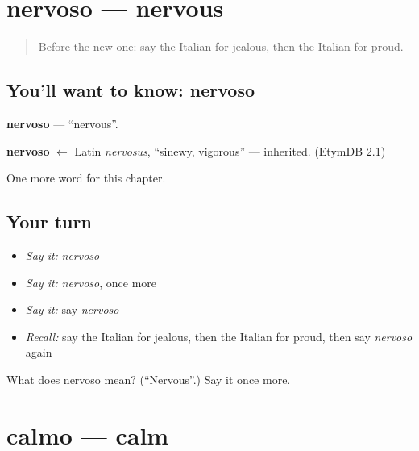 \section[nervoso]{nervoso — nervous}

\label{lesson:IT-C218-nervoso}



\begin{quote}
Before the new one: say the Italian for jealous, then the Italian for proud.
\end{quote}

\subsection*{You'll want to know: nervoso}
\textbf{nervoso} — \textquotedblleft{}nervous\textquotedblright{}.

\begin{cousinweb}
\textbf{nervoso} $\leftarrow$ Latin \emph{nervosus}, \textquotedblleft{}sinewy, vigorous\textquotedblright{} — inherited. (EtymDB 2.1)
\end{cousinweb}

\begin{grammarlens}[title={What you've built}]
One more word for this chapter.
\end{grammarlens}

\subsection*{Your turn}
\begin{itemize}
\raggedright
  \item \emph{Say it:} \emph{nervoso}
  \item \emph{Say it:} \emph{nervoso}, once more
  \item \emph{Say it:} say \emph{nervoso}
  \item \emph{Recall:} say the Italian for jealous, then the Italian for proud, then say \emph{nervoso} again
\end{itemize}

\begin{tcolorbox}[breakable,colback=teal!4,colframe=teal!35!black,title={Before you move on}]
What does nervoso mean? (\textquotedblleft{}Nervous\textquotedblright{}.) Say it once more.
\end{tcolorbox}
\section[calmo]{calmo — calm}

